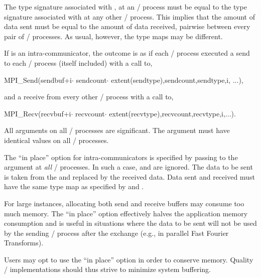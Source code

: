 The type signature associated with ,
at an \MPI/ process must be equal to the type signature associated with
 at any other \MPI/ process.
This implies that the amount of data sent must be equal to the
amount of data received, pairwise between every pair of \MPI/ processes.
As usual, however, the type maps may be different.

If  is an intra-communicator,
the outcome is as if each \MPI/ process executed a send to each
\MPI/ process (itself included)
with a call to,
\begin{mpicodeblock}
MPI\_Send(sendbuf+i$\cdot$ sendcount$\cdot$
extent(sendtype),sendcount,sendtype,i, ...),
\end{mpicodeblock}
\noindent and a receive from every other \MPI/ process
with a call to,
\begin{mpicodeblock}
MPI\_Recv(recvbuf+i$\cdot$ recvcount$\cdot$ extent(recvtype),recvcount,recvtype,i,...).
\end{mpicodeblock}

All arguments
on all \MPI/ processes are significant.  The argument 
must have identical values on all \MPI/ processes.

The ``in place'' option for intra-communicators is specified by passing
 to the argument  at \emph{all} \MPI/ processes.
In such a case,  and  are ignored.
The data to be sent is taken from the  and replaced by the received data.
Data sent and received must have the same type map as specified by  and .

\begin{rationale}
For large  instances,
allocating both send and receive buffers may consume too much memory.
The ``in place'' option effectively halves the application memory consumption
and is useful in situations where the data to be sent will not be used by the
sending \MPI/ process after the  exchange (e.g., in parallel
Fast Fourier Transforms).
\end{rationale}

\begin{implementors}
Users may opt to use the ``in place'' option in order to conserve memory.
Quality \MPI/ implementations should thus strive to minimize system buffering.
\end{implementors}

